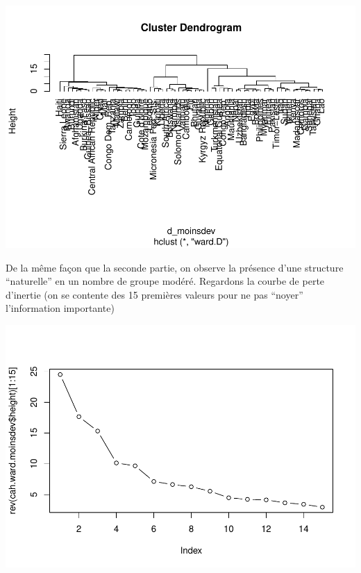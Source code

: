 \documentclass[
]{article}
\newenvironment{Shaded}{}{}
\newcommand{\AttributeTok}[1]{#1}
\newcommand{\DecValTok}[1]{#1}
\newcommand{\FunctionTok}[1]{#1}
\newcommand{\NormalTok}[1]{#1}
\newcommand{\SpecialCharTok}[1]{\textcolor[rgb]{0.00,0.50,0.50}{#1}}
\newcommand{\StringTok}[1]{\textcolor[rgb]{0.00,0.50,0.50}{#1}}
\begin{document}
\includegraphics{Projet_files/figure-latex/unnamed-chunk-30-1.pdf}

De la même façon que la seconde partie, on observe la présence d'une
structure ``naturelle'' en un nombre de groupe modéré. Regardons la
courbe de perte d'inertie (on se contente des 15 premières valeurs pour
ne pas ``noyer'' l'information importante)

\begin{Shaded}
\end{Shaded}

\includegraphics{Projet_files/figure-latex/unnamed-chunk-31-1.pdf}
\end{document}

